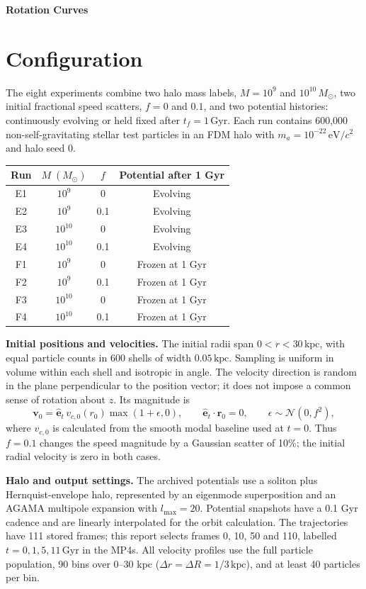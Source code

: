 \documentclass[a4paper,11pt]{article}
\newcommand{\Msun}{M_{\odot}}
\begin{document}
{\LARGE\bfseries Rotation Curves\par}
\section{Configuration}
The eight experiments combine two halo mass labels,
$M=10^9$ and $10^{10}\,\Msun$, two initial fractional speed scatters,
$f=0$ and $0.1$, and two potential histories: continuously evolving or
held fixed after $t_f=1\,\mathrm{Gyr}$. Each run contains 600,000
non-self-gravitating stellar test particles in an FDM halo with
$m_a=10^{-22}\,\mathrm{eV}/c^2$ and halo seed 0.

\begin{center}
\begin{tabular}{@{}cccc@{}}
\toprule
Run & $M\;(\Msun)$ & $f$ & Potential after 1 Gyr\\
\midrule
E1 & $10^9$ & 0 & Evolving\\
E2 & $10^9$ & 0.1 & Evolving\\
E3 & $10^{10}$ & 0 & Evolving\\
E4 & $10^{10}$ & 0.1 & Evolving\\
F1 & $10^9$ & 0 & Frozen at 1 Gyr\\
F2 & $10^9$ & 0.1 & Frozen at 1 Gyr\\
F3 & $10^{10}$ & 0 & Frozen at 1 Gyr\\
F4 & $10^{10}$ & 0.1 & Frozen at 1 Gyr\\
\bottomrule
\end{tabular}
\end{center}

\textbf{Initial positions and velocities.}
The initial radii span $0<r<30\,\mathrm{kpc}$, with equal particle counts
in 600 shells of width $0.05\,\mathrm{kpc}$. Sampling is uniform in volume
within each shell and isotropic in angle. The velocity direction is
random in the plane perpendicular to the position vector; it does not
impose a common sense of rotation about $z$. Its magnitude is
\begin{equation}
 \mathbf v_0=\hat{\mathbf e}_t\,v_{c,0}(r_0)\max(1+\epsilon,0),
 \qquad \hat{\mathbf e}_t\cdot\mathbf r_0=0,
 \qquad \epsilon\sim\mathcal N(0,f^2),
\end{equation}
where $v_{c,0}$ is calculated from the smooth modal baseline used at
$t=0$. Thus $f=0.1$ changes the speed magnitude by a Gaussian scatter
of 10\%; the initial radial velocity is zero in both cases.

\textbf{Halo and output settings.}
The archived potentials use a soliton plus Hernquist-envelope halo,
represented by an eigenmode superposition and an AGAMA multipole
expansion with $l_{\max}=20$. Potential snapshots have a 0.1 Gyr cadence and are
linearly interpolated for the orbit calculation. The trajectories have
111 stored frames; this report selects frames 0, 10, 50 and 110,
labelled $t=0,1,5,11\,\mathrm{Gyr}$ in the MP4s. All velocity profiles
use the full particle population, 90 bins over 0--30 kpc
($\Delta r=\Delta R=1/3\,\mathrm{kpc}$), and at least 40 particles per bin.
\end{document}
